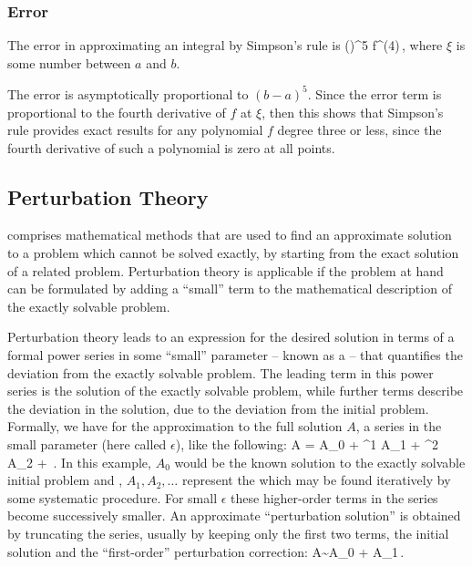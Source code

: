 \subsubsection{Error}
The error in approximating an integral by Simpson's rule is
\beq
{}\left(\right)^5 \big\vert f^{(4)}\vat\xi \big\vert\,, 
\eeq
where $\xi$ is some number between $a$ and $b$.

The error is asymptotically proportional to $(b-a)^5$. Since the error term is proportional to the fourth derivative of $f$ at $\xi$, then this shows that Simpson's rule provides exact results for any polynomial $f$ degree three or less, since the fourth derivative of such a polynomial is zero at all points.


\subsection{Perturbation Theory}
 comprises mathematical methods that are used to find an approximate solution to a problem which cannot be solved exactly, by starting from the exact solution of a related problem. Perturbation theory is applicable if the problem at hand can be formulated by adding a ``small'' term to the mathematical description of the exactly solvable problem.

Perturbation theory leads to an expression for the desired solution in terms of a formal power series in some ``small'' parameter -- known as a  -- that quantifies the deviation from the exactly solvable problem. The leading term in this power series is the solution of the exactly solvable problem, while further terms describe the deviation in the solution, due to the deviation from the initial problem. Formally, we have for the approximation to the full solution $A$, a series in the small parameter (here called $\epsilon$), like the following:
\beq
A = A_0 + \epsilon^1 A_1 + \epsilon^2 A_2 + \dotsb\,.
\eeq
In this example, $A_0$ would be the known solution to the exactly solvable initial problem and , $A_1,A_2,\dotsc$ represent the  which may be found iteratively by some systematic procedure. For small $\epsilon$ these higher-order terms in the series become successively smaller. An approximate ``perturbation solution'' is obtained by truncating the series, usually by keeping only the first two terms, the initial solution and the ``first-order'' perturbation correction:
\beq
A\sim A_0 + \epsilon A_1\,.
\eeq


